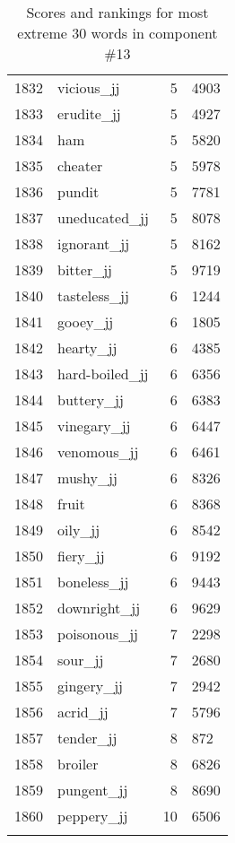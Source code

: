 \begin{longtable}[!htbp]{| rlr@{.}l |}
    1832 & vicious\_jj & 5 & 4903 \\
    1833 & erudite\_jj & 5 & 4927 \\
    1834 & ham & 5 & 5820 \\
    1835 & cheater & 5 & 5978 \\
    1836 & pundit & 5 & 7781 \\
    1837 & uneducated\_jj & 5 & 8078 \\
    1838 & ignorant\_jj & 5 & 8162 \\
    1839 & bitter\_jj & 5 & 9719 \\
    1840 & tasteless\_jj & 6 & 1244 \\
    1841 & gooey\_jj & 6 & 1805 \\
    1842 & hearty\_jj & 6 & 4385 \\
    1843 & hard-boiled\_jj & 6 & 6356 \\
    1844 & buttery\_jj & 6 & 6383 \\
    1845 & vinegary\_jj & 6 & 6447 \\
    1846 & venomous\_jj & 6 & 6461 \\
    1847 & mushy\_jj & 6 & 8326 \\
    1848 & fruit & 6 & 8368 \\
    1849 & oily\_jj & 6 & 8542 \\
    1850 & fiery\_jj & 6 & 9192 \\
    1851 & boneless\_jj & 6 & 9443 \\
    1852 & downright\_jj & 6 & 9629 \\
    1853 & poisonous\_jj & 7 & 2298 \\
    1854 & sour\_jj & 7 & 2680 \\
    1855 & gingery\_jj & 7 & 2942 \\
    1856 & acrid\_jj & 7 & 5796 \\
    1857 & tender\_jj & 8 & 872 \\
    1858 & broiler & 8 & 6826 \\
    1859 & pungent\_jj & 8 & 8690 \\
    1860 & peppery\_jj & 10 & 6506 \\
    \hline
    \caption{Scores and rankings for most extreme 30 words in component \#13} \\
\end{longtable}

